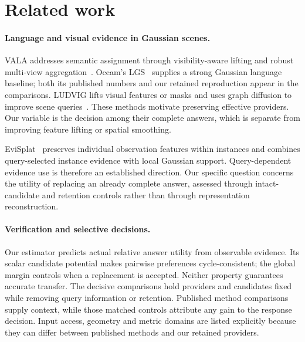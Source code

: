 \section{Related work}
\paragraph{Language and visual evidence in Gaussian scenes.}
VALA addresses semantic assignment through visibility-aware lifting and robust
multi-view aggregation~\cite{vala}. Occam's LGS~\cite{occam} supplies a strong Gaussian
language baseline; both its published numbers and our retained reproduction
appear in the comparisons. LUDVIG lifts visual features or masks and uses graph
diffusion to improve scene queries~\cite{ludvig}. These methods motivate preserving
effective providers. Our variable is the decision among their complete answers,
which is separate from improving feature lifting or spatial smoothing.

EviSplat~\cite{evisplat} preserves individual observation features within
instances and combines query-selected instance evidence with local Gaussian
support. Query-dependent evidence use is therefore an established direction.
Our specific question concerns the utility of replacing an already complete
answer, assessed through intact-candidate and retention controls rather than
through representation reconstruction.

\paragraph{Verification and selective decisions.}
Our estimator predicts actual relative answer utility from observable evidence.
Its scalar candidate potential makes pairwise preferences cycle-consistent;
the global margin controls when a replacement is accepted. Neither property
guarantees accurate transfer. The decisive comparisons hold providers and
candidates fixed while removing query information or retention. Published
method comparisons supply context, while those matched controls attribute any
gain to the response decision. Input access, geometry and metric domains are
listed explicitly because they can differ between published methods and our
retained providers.
